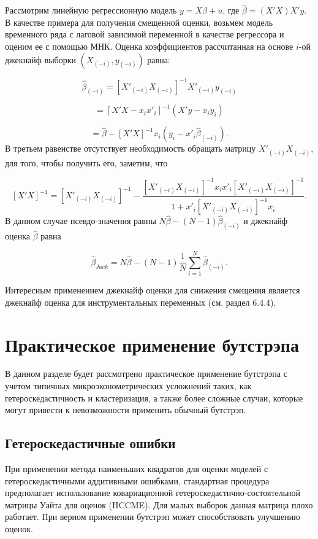 Рассмотрим линейную регрессионную модель $y=X\beta+u$, где $\hat{\beta}=(X'X)X'y$. В качестве примера для получения смещенной оценки, возьмем модель временного ряда с лаговой зависимой переменной в качестве регрессора и оценим ее с помощью МНК. Оценка коэффициентов рассчитанная на основе $i$-ой джекнайф выборки  $(X_{(-i)},y_{(-i)})$ равна:

\[
\hat{\beta}_{(-i)}=[X'_{(-i)}X_{(-i)}]^{-1}X'_{(-i)}y_{(-i)}
\]


\[
=[X'X-x_{i}x'_i]^{-1}(X'y-x_{i}y_i)
\]


\[
=\hat{\beta}-[X'X]^{-1}x_i(y_i-x'_{i}\hat{\beta}_{(-i)}).
\]
В третьем равенстве отсутствует необходимость обращать матрицу $X'_{(-i)}X_{(-i)}$, для того, чтобы получить его, заметим, что

\[
[X'X]^{-1}=[X'_{(-i)}X_{(-i)}]^{-1}
-\dfrac{[X'_{(-i)}X_{(-i)}]^{-1} x_i x'_i[X'_{(-i)} X_{(-i)}]^{-1}}{1+x'_{i}[X'_{(-i)}X_{(-i)}]^{-1}x_{i}}.
\]
В данном случае псевдо-значения равны $N\hat{\beta}-(N-1)\hat{\beta}_{(-i)}$ и джекнайф оценка $\hat{\beta}$ равна 

\begin{equation}
\hat{\beta}_{Jack}=N\hat{\beta}-(N-1)\dfrac{1}{N}\sum^{N}_{i=1}\hat{\beta}_{(-i)}.
\end{equation}

Интересным применением джекнайф оценки для снижения смещения является джекнайф оценка для инструментальных переменных (см. раздел 6.4.4).


\section{Практическое применение бутстрэпа}

В данном разделе будет рассмотрено практическое применение бутстрэпа с учетом типичных микроэконометрических усложнений таких, как гетероскедастичность и кластеризация, а также более сложные случаи, которые могут привести к невозможности применить обычный бутстрэп.

\subsection{Гетероскедастичные ошибки}

При применении метода наименьших квадратов для оценки моделей с гетероскедастичными аддитивными ошибками, стандартная процедура предполагает использование ковариационной гетероскедастично-состоятельной матрицы Уайта для оценок (HCCME). Для малых выборок данная матрица плохо работает. При верном применении бутстрэп может способствовать улучшению оценок.

